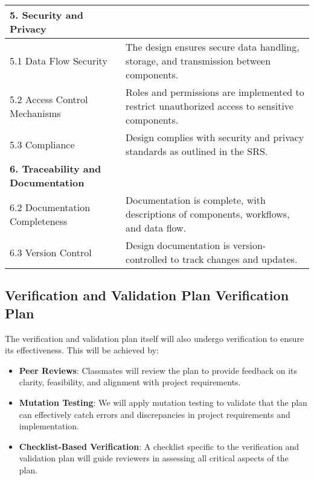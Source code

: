 \documentclass[12pt, titlepage]{article}
\begin{document}
\begin{center}
\begin{longtable}{|p{4cm}|p{11cm}|}
  \textbf{5. Security and Privacy} & \\
  \hline
  5.1 Data Flow Security & The design ensures secure data handling, storage, and transmission between components. \\
  \hline
  5.2 Access Control Mechanisms & Roles and permissions are implemented to restrict unauthorized access to sensitive components. \\
  \hline
  5.3 Compliance & Design complies with security and privacy standards as outlined in the SRS. \\
  \hline
  
  \textbf{6. Traceability and Documentation} & \\
  \hline
  6.2 Documentation Completeness & Documentation is complete, with descriptions of components, workflows, and data flow. \\
  \hline
  6.3 Version Control & Design documentation is version-controlled to track changes and updates. \\
  \hline
  
  \end{longtable}
  \end{center}

\subsection{Verification and Validation Plan Verification Plan}

The verification and validation plan itself will also undergo verification to ensure its effectiveness. This will be achieved by:

\begin{itemize}
    \item \textbf{Peer Reviews}: Classmates will review the plan to provide feedback on its clarity, feasibility, and alignment with project requirements.
    \item \textbf{Mutation Testing}: We will apply mutation testing to validate that the plan can effectively catch errors and discrepancies in project requirements and implementation.
    \item \textbf{Checklist-Based Verification}: A checklist specific to the verification and validation plan will guide reviewers in assessing all critical aspects of the plan.
\end{itemize}
\end{document}
